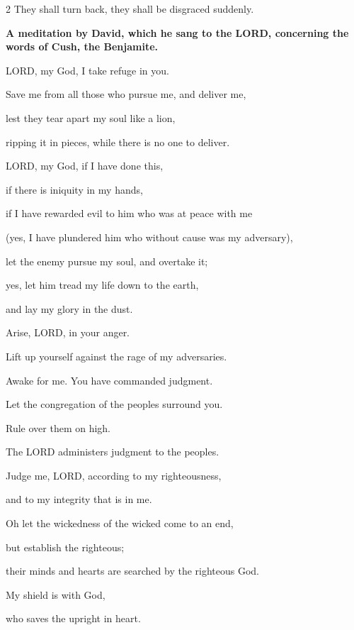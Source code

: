 \begin{multicols}{2}
	They shall turn back, they shall be disgraced suddenly.
	
	
	\mychapter{}\textbf{A meditation by David, which he sang to the LORD, concerning the words of Cush, the Benjamite.}
	
	\myverse*{}LORD, my God, I take refuge in you.
	
	Save me from all those who pursue me, and deliver me,
	
	
	\myverse{}lest they tear apart my soul like a lion,
	
	ripping it in pieces, while there is no one to deliver.
	
	
	\myverse{}LORD, my God, if I have done this,
	
	if there is iniquity in my hands,
	
	
	\myverse{}if I have rewarded evil to him who was at peace with me
	
	(yes, I have plundered him who without cause was my adversary),
	
	
	\myverse{}let the enemy pursue my soul, and overtake it;
	
	yes, let him tread my life down to the earth,
	
	and lay my glory in the dust.
	
	
	\vspace{\baselineskip}
	
	
	\myverse{}Arise, LORD, in your anger.
	
	Lift up yourself against the rage of my adversaries.
	
	Awake for me. You have commanded judgment.
	
	
	\myverse{}Let the congregation of the peoples surround you.
	
	Rule over them on high.
	
	
	\myverse{}The LORD administers judgment to the peoples.
	
	Judge me, LORD, according to my righteousness,
	
	and to my integrity that is in me.
	
	
	\myverse{}Oh let the wickedness of the wicked come to an end,
	
	but establish the righteous;
	
	their minds and hearts are searched by the righteous God.
	
	
	\myverse{}My shield is with God,
	
	who saves the upright in heart.
	

\end{multicols}
